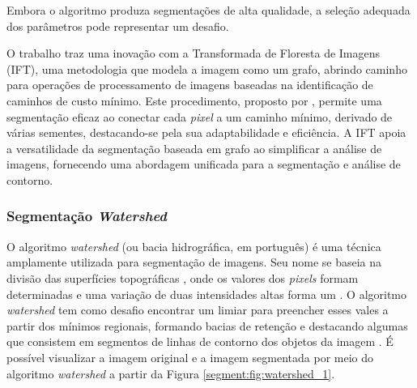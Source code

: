 Embora o algoritmo produza segmentações de alta qualidade, a seleção adequada dos parâmetros pode representar um desafio.

O trabalho \cite{falcao2004image} traz uma inovação com a Transformada de Floresta de Imagens (IFT), uma metodologia que modela a imagem como um grafo, abrindo caminho para operações de processamento de imagens baseadas na identificação de caminhos de custo mínimo. Este procedimento, proposto por \cite{falcao2004image}, permite uma segmentação eficaz ao conectar cada \textit{pixel} a um caminho mínimo, derivado de várias sementes, destacando-se pela sua adaptabilidade e eficiência. A IFT apoia a versatilidade da segmentação baseada em grafo ao simplificar a análise de imagens, fornecendo uma abordagem unificada para a segmentação e análise de contorno.

\subsubsection{Segmentação \textit{Watershed}}
\label{segment:watershed}
O algoritmo \textit{watershed} (ou bacia hidrográfica, em português) é uma técnica amplamente utilizada para segmentação de imagens. Seu nome se baseia na divisão das superfícies topográficas \citep{pedrini2008analise}, onde os valores dos \textit{pixels} formam determinadas  e uma variação de duas intensidades altas forma um . O algoritmo \textit{watershed} tem como desafio encontrar um limiar para preencher esses vales a partir dos mínimos regionais, formando bacias de retenção e destacando algumas  que consistem em segmentos de linhas de contorno dos objetos da imagem \citep{pedrini2008analise, SealWatershed:Approach}. É possível visualizar a imagem original e a imagem segmentada por meio do algoritmo \textit{watershed} a partir da Figura \ref{segment:fig:watershed_1}.

